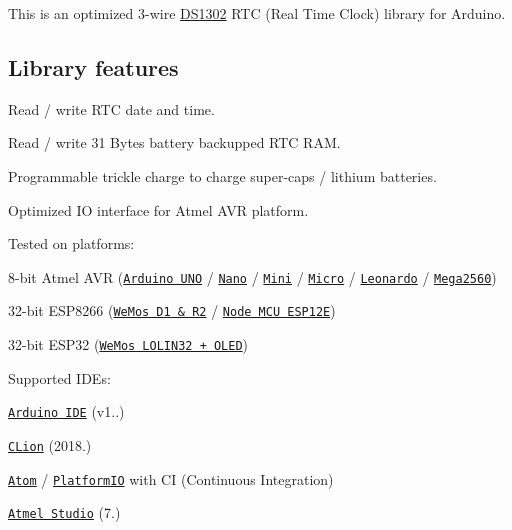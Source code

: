\href{https://travis-ci.org/Erriez/ErriezDS1302}{\tt }

This is an optimized 3-\/wire \hyperlink{class_d_s1302}{D\+S1302} R\+TC (Real Time Clock) library for Arduino.



\subsection*{Library features}


\begin{DoxyItemize}
\item Read / write R\+TC date and time.
\item Read / write 31 Bytes battery backupped R\+TC R\+AM.
\item Programmable trickle charge to charge super-\/caps / lithium batteries.
\item Optimized IO interface for Atmel A\+VR platform.
\item Tested on platforms\+:
\begin{DoxyItemize}
\item 8-\/bit Atmel A\+VR (\href{https://store.arduino.cc/arduino-uno-rev3}{\tt Arduino U\+NO} / \href{https://store.arduino.cc/arduino-nano}{\tt Nano} / \href{https://store.arduino.cc/arduino-mini-05}{\tt Mini} / \href{https://store.arduino.cc/arduino-micro}{\tt Micro} / \href{https://store.arduino.cc/arduino-leonardo-with-headers}{\tt Leonardo} / \href{https://store.arduino.cc/arduino-mega-2560-rev3}{\tt Mega2560})
\item 32-\/bit E\+S\+P8266 (\href{https://www.google.com/search?q=wemos+d1+r2&tbm=isch}{\tt We\+Mos D1 \& R2} / \href{https://www.google.com/search?q=geekcreit+esp12e+devkit+v2&tbm=isch}{\tt Node M\+CU E\+S\+P12E})
\item 32-\/bit E\+S\+P32 (\href{https://www.google.com/search?q=wemos+lolin32+oled&tbm=isch}{\tt We\+Mos L\+O\+L\+I\+N32 + O\+L\+ED})
\end{DoxyItemize}
\item Supported I\+DE\textquotesingle{}s\+:
\begin{DoxyItemize}
\item \href{https://www.arduino.cc/en/Main/Software}{\tt Arduino I\+DE} (v1..)
\item \href{https://www.jetbrains.com/clion/download}{\tt C\+Lion} (2018.)
\item \href{https://atom.io/}{\tt Atom} / \href{https://platformio.org/}{\tt Platform\+IO} with CI (Continuous Integration)
\item \href{https://www.microchip.com/mplab/avr-support/atmel-studio-7}{\tt Atmel Studio} (7.)
\end{DoxyItemize}
\end{DoxyItemize}

